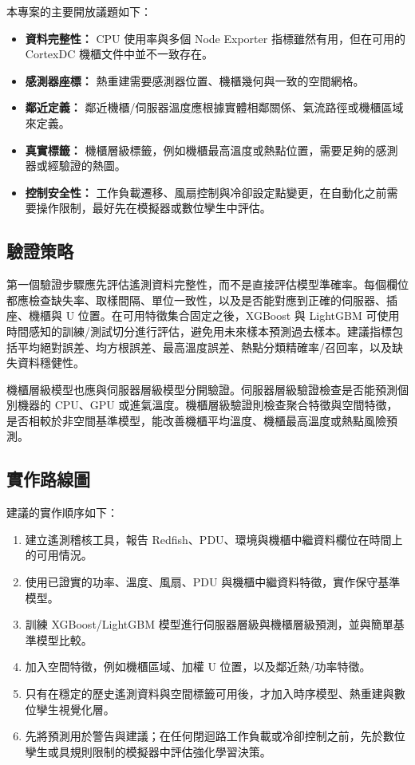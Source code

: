 \documentclass[12pt,a4paper]{article}
\begin{document}
本專案的主要開放議題如下：
\begin{itemize}
\item \textbf{資料完整性：} CPU 使用率與多個 Node Exporter 指標雖然有用，但在可用的 CortexDC 機櫃文件中並不一致存在。
\item \textbf{感測器座標：} 熱重建需要感測器位置、機櫃幾何與一致的空間網格。
\item \textbf{鄰近定義：} 鄰近機櫃/伺服器溫度應根據實體相鄰關係、氣流路徑或機櫃區域來定義。
\item \textbf{真實標籤：} 機櫃層級標籤，例如機櫃最高溫度或熱點位置，需要足夠的感測器或經驗證的熱圖。
\item \textbf{控制安全性：} 工作負載遷移、風扇控制與冷卻設定點變更，在自動化之前需要操作限制，最好先在模擬器或數位孿生中評估。
\end{itemize}

\subsection{驗證策略}

第一個驗證步驟應先評估遙測資料完整性，而不是直接評估模型準確率。每個欄位都應檢查缺失率、取樣間隔、單位一致性，以及是否能對應到正確的伺服器、插座、機櫃與 U 位置。在可用特徵集合固定之後，XGBoost 與 LightGBM 可使用時間感知的訓練/測試切分進行評估，避免用未來樣本預測過去樣本。建議指標包括平均絕對誤差、均方根誤差、最高溫度誤差、熱點分類精確率/召回率，以及缺失資料穩健性。

機櫃層級模型也應與伺服器層級模型分開驗證。伺服器層級驗證檢查是否能預測個別機器的 CPU、GPU 或進氣溫度。機櫃層級驗證則檢查聚合特徵與空間特徵，是否相較於非空間基準模型，能改善機櫃平均溫度、機櫃最高溫度或熱點風險預測。

\subsection{實作路線圖}

建議的實作順序如下：
\begin{enumerate}
\item 建立遙測稽核工具，報告 Redfish、PDU、環境與機櫃中繼資料欄位在時間上的可用情況。
\item 使用已證實的功率、溫度、風扇、PDU 與機櫃中繼資料特徵，實作保守基準模型。
\item 訓練 XGBoost/LightGBM 模型進行伺服器層級與機櫃層級預測，並與簡單基準模型比較。
\item 加入空間特徵，例如機櫃區域、加權 U 位置，以及鄰近熱/功率特徵。
\item 只有在穩定的歷史遙測資料與空間標籤可用後，才加入時序模型、熱重建與數位孿生視覺化層。
\item 先將預測用於警告與建議；在任何閉迴路工作負載或冷卻控制之前，先於數位孿生或具規則限制的模擬器中評估強化學習決策。
\end{enumerate}
\end{document}
